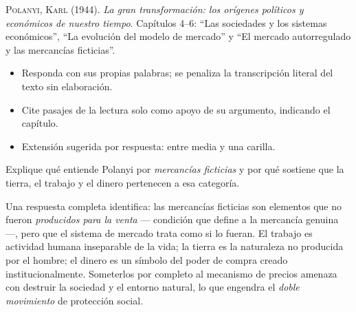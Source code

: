 \documentclass{academic-exam}
\begin{document}
\membrete

\begin{datos}
\textsc{Polanyi, Karl} (1944). \emph{La gran transformación: los orígenes
políticos y económicos de nuestro tiempo}. Capítulos 4--6:
\enquote{Las sociedades y los sistemas económicos}, \enquote{La evolución
del modelo de mercado} y \enquote{El mercado autorregulado y las
mercancías ficticias}.
\end{datos}

\begin{instrucciones}
\begin{itemize}
  \item Responda con sus propias palabras; se penaliza la transcripción
        literal del texto sin elaboración.
  \item Cite pasajes de la lectura solo como apoyo de su argumento,
        indicando el capítulo.
  \item Extensión sugerida por respuesta: entre media y una carilla.
\end{itemize}
\end{instrucciones}

\begin{pregunta}[4][Comprensión]
Explique qué entiende Polanyi por \emph{mercancías ficticias} y por qué
sostiene que la tierra, el trabajo y el dinero pertenecen a esa
categoría.
\begin{solucion}
Una respuesta completa identifica: las mercancías ficticias son elementos
que no fueron \emph{producidos para la venta} — condición que define a la
mercancía genuina —, pero que el sistema de mercado trata como si lo
fueran. El trabajo es actividad humana inseparable de la vida; la tierra
es la naturaleza no producida por el hombre; el dinero es un símbolo del
poder de compra creado institucionalmente. Someterlos por completo al
mecanismo de precios amenaza con destruir la sociedad y el entorno
natural, lo que engendra el \emph{doble movimiento} de protección social.
\end{solucion}
\end{pregunta}
\end{document}
